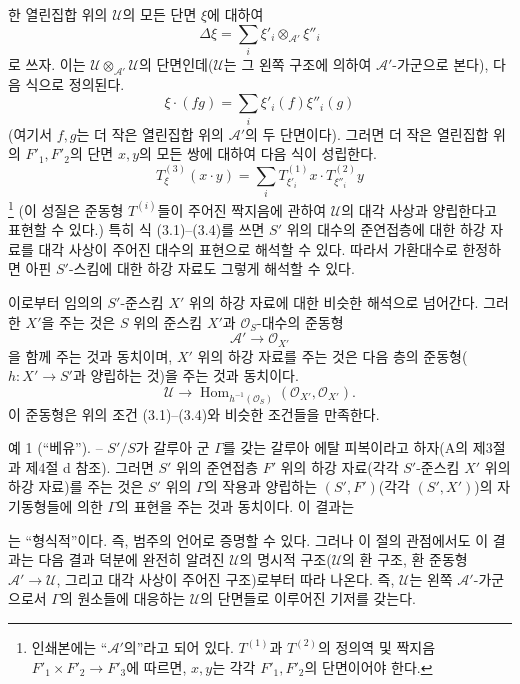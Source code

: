 한 열린집합 위의 $\mathcal U$의 모든 단면 $\xi$에 대하여
\[
  \Delta\xi=\sum_i\xi'_i\otimes_{\mathcal A'}\xi''_i
\]
로 쓰자. 이는 $\mathcal U\otimes_{\mathcal A'}\mathcal U$의
단면인데($\mathcal U$는 그 왼쪽 구조에 의하여 $\mathcal A'$-가군으로
본다), 다음 식으로 정의된다.
\[
  \xi\mathbin{\cdot}(fg)=\sum_i\xi'_i(f)\xi''_i(g)
\]
(여기서 $f,g$는 더 작은 열린집합 위의 $\mathcal A'$의 두 단면이다).
그러면 더 작은 열린집합 위의 $F'_1,F'_2$의 단면 $x,y$의 모든
쌍에 대하여 다음 식이 성립한다.
\begin{equation}
  T^{(3)}_\xi(x\mathbin{\cdot}y)
  =\sum_iT^{(1)}_{\xi'_i}x\mathbin{\cdot}T^{(2)}_{\xi''_i}y
  \tag{3.4}
\end{equation}
\footnote{인쇄본에는 “$\mathcal A'$의”라고 되어 있다.
$T^{(1)}$과 $T^{(2)}$의 정의역 및 짝지음
$F'_1\times F'_2\longrightarrow F'_3$에 따르면, $x,y$는 각각
$F'_1,F'_2$의 단면이어야 한다.} (이 성질은 준동형 $T^{(i)}$들이
주어진 짝지음에 관하여 $\mathcal U$의 대각 사상과 양립한다고
표현할 수 있다.) 특히 식 (3.1)--(3.4)를 쓰면 $S'$ 위의 대수의
준연접층에 대한 하강 자료를 대각 사상이 주어진 대수의 표현으로
해석할 수 있다. 따라서 가환대수로 한정하면 아핀 $S'$-스킴에 대한
하강 자료도 그렇게 해석할 수 있다.

이로부터 임의의 $S'$-준스킴 $X'$ 위의 하강 자료에 대한 비슷한
해석으로 넘어간다. 그러한 $X'$을 주는 것은 $S$ 위의 준스킴
$X'$과 $\mathcal O_S$-대수의 준동형
\[
  \mathcal A'\longrightarrow\mathcal O_{X'}
\]
을 함께 주는 것과 동치이며, $X'$ 위의 하강 자료를 주는 것은
다음 층의 준동형($h:X'\longrightarrow S'$과 양립하는 것)을
주는 것과 동치이다.
\[
  \mathcal U\longrightarrow
  \operatorname{Hom}_{h^{-1}(\mathcal O_S)}
  (\mathcal O_{X'},\mathcal O_{X'}).
\]
이 준동형은 위의 조건 (3.1)--(3.4)와 비슷한 조건들을 만족한다.

\textsc{예 1 (“베유”).} -- $S'/S$가 갈루아 군 $\Gamma$를 갖는
갈루아 에탈 피복이라고 하자(A의 제3절과 제4절 d 참조). 그러면
$S'$ 위의 준연접층 $F'$ 위의 하강 자료(각각 $S'$-준스킴 $X'$ 위의
하강 자료)를 주는 것은 $S'$ 위의 $\Gamma$의 작용과 양립하는
$(S',F')$(각각 $(S',X')$)의 자기동형들에 의한 $\Gamma$의 표현을
주는 것과 동치이다. 이 결과는

는 “형식적”이다. 즉, 범주의 언어로 증명할 수 있다. 그러나 이 절의
관점에서도 이 결과는 다음 결과 덕분에 완전히 알려진 $\mathcal U$의 명시적
구조($\mathcal U$의 환 구조, 환 준동형
$\mathcal A'\longrightarrow\mathcal U$, 그리고 대각 사상이 주어진 구조)로부터
따라 나온다. 즉, $\mathcal U$는 왼쪽 $\mathcal A'$-가군으로서
$\Gamma$의 원소들에 대응하는 $\mathcal U$의 단면들로 이루어진 기저를 갖는다.

